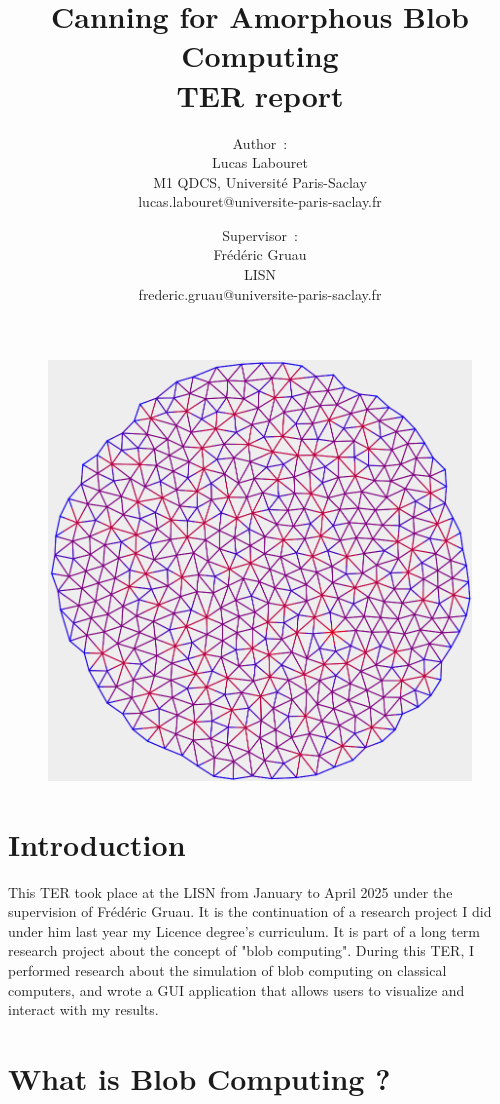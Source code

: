 \documentclass{article}
\title{
	Canning for Amorphous Blob Computing\\
	\small TER report
}
\author{
    Author~:\\
    Lucas Labouret\\
    M1 QDCS, Université Paris-Saclay\\
    \small lucas.labouret@universite-paris-saclay.fr
    \and
    Supervisor~:\\
    Frédéric Gruau\\
    LISN\\
    \small frederic.gruau@universite-paris-saclay.fr
}
\date{}
\begin{document}
 
\maketitle

\begin{figure}[H]
	\centering\includegraphics[width=0.9\linewidth]{assets/Circle500.png}
\end{figure}

\newpage
\tableofcontents
\newpage

\section*{Introduction}
\label{introduction}

This TER took place at the LISN from January to April 2025 under the supervision of Frédéric Gruau. It is the continuation of a research project I did under him last year  my Licence degree's curriculum. It is part of a long term research project about the concept of "blob computing"\supercite{blob_computing1}. During this TER, I performed research about the simulation of blob computing on classical computers, and wrote a GUI application that allows users to visualize and interact with my results.

\section{What is Blob Computing ?}
\end{document}
